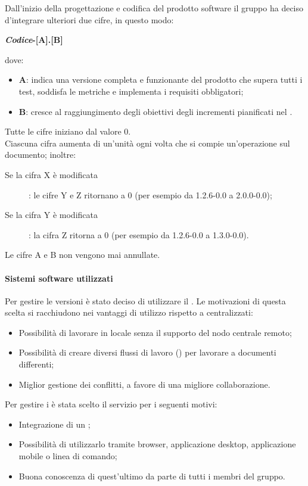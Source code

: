 Dall'inizio della progettazione e codifica del prodotto software il gruppo ha deciso d'integrare ulteriori due cifre, in questo  modo:
\begin{center}
\textbf{\textit{Codice}-[A].[B]} 
\end{center}
dove: 
\begin{itemize}
	\item \textbf{A}: indica una versione completa e funzionante del prodotto che supera tutti i test, soddisfa le metriche e implementa i requisiti obbligatori;
	\item \textbf{B}: cresce al raggiungimento degli obiettivi degli incrementi pianificati nel . 
\end{itemize}

Tutte le cifre iniziano dal valore 0. \\ 
Ciascuna cifra aumenta di un'unità ogni volta che si compie un'operazione sul documento; inoltre:
\begin{description}
	\item[Se la cifra X è modificata] : le cifre Y e Z ritornano a 0 (per esempio da 1.2.6-0.0 a 2.0.0-0.0);
	\item[Se la cifra Y è modificata] : la cifra Z ritorna a 0 (per esempio da 1.2.6-0.0 a 1.3.0-0.0).
\end{description}
Le cifre A e B non vengono mai annullate.

\paragraph{Sistemi software utilizzati}
Per gestire le versioni è stato deciso di utilizzare il  . 
Le motivazioni di questa scelta si racchiudono nei vantaggi di utilizzo rispetto a  centralizzati:
\begin{itemize}
	\item Possibilità di lavorare in locale senza il supporto del nodo centrale remoto; 
	\item Possibilità di creare diversi flussi di lavoro () per lavorare a documenti differenti;
	\item Miglior gestione dei conflitti, a favore di una migliore collaborazione.
\end{itemize}
Per gestire i   è stata scelto il servizio  per i seguenti motivi: 
\begin{itemize}
	\item Integrazione di un ;
	\item Possibilità di utilizzarlo tramite browser, applicazione desktop, applicazione mobile o linea di comando;
	\item Buona conoscenza di quest'ultimo da parte di tutti i membri del gruppo.
\end{itemize}

